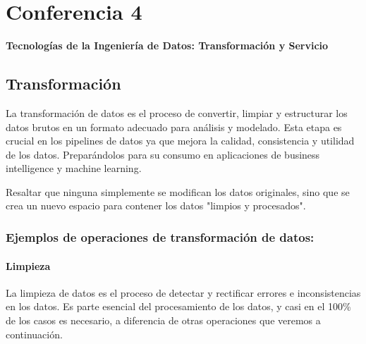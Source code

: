 \documentclass[12pt]{book}
\begin{document}


\chapter{Conferencia 4}
\normalfont\LARGE \textbf{Tecnologías de la Ingeniería de Datos: Transformación y Servicio}
\normalfont\small\\

\section{Transformación}
La transformación de datos es el proceso de convertir, limpiar y estructurar los datos 
brutos en un formato adecuado para análisis y modelado. Esta etapa es crucial en los 
pipelines de datos ya que mejora la calidad, consistencia y utilidad de los datos. Preparándolos 
para su consumo en aplicaciones de business intelligence y machine learning.

Resaltar que ninguna simplemente se modifican los datos originales, sino que se crea un nuevo espacio para contener los datos "limpios y procesados".

\subsection{Ejemplos de operaciones de transformación de datos:}

\subsubsection{Limpieza}
La limpieza de datos es el proceso de detectar y rectificar errores e inconsistencias en 
los datos. Es parte esencial del procesamiento de los datos, y casi en el 100\% de los casos 
es necesario, a diferencia de otras operaciones que veremos a continuación. 
\end{document}

